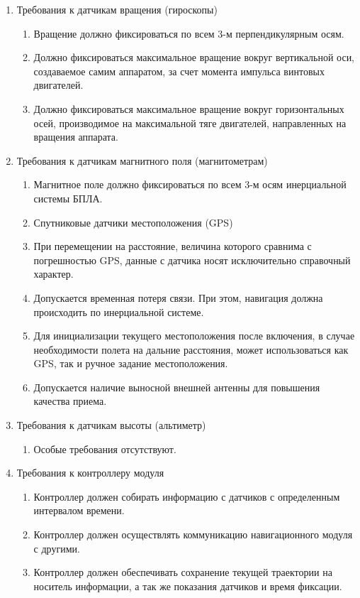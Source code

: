 \documentclass[utf8]{report}
\begin{document}
\begin{enumerate}
\begin{enumerate}
  \end{enumerate}
  \item Требования к датчикам вращения (гироскопы)
  \begin{enumerate}
    \item Вращение должно фиксироваться по всем 3-м перпендикулярным осям.
    \item Должно фиксироваться максимальное вращение вокруг вертикальной оси, создаваемое самим аппаратом, за счет момента импульса винтовых двигателей.
    \item Должно фиксироваться максимальное вращение вокруг горизонтальных осей, производимое на максимальной тяге двигателей, направленных на вращения аппарата.
  \end{enumerate}
  \item Требования к датчикам магнитного поля (магнитометрам)
  \begin{enumerate}
    \item Магнитное поле должно фиксироваться по всем 3-м осям инерциальной системы БПЛА.
    \item Спутниковые датчики местоположения (GPS)
    \item При перемещении на расстояние, величина которого сравнима с погрешностью GPS, данные с датчика носят исключительно справочный характер.
    \item Допускается временная потеря связи. При этом, навигация должна происходить по инерциальной системе.
    \item Для инициализации текущего местоположения после включения, в случае необходимости полета на дальние расстояния, может использоваться как GPS,  так и ручное задание местоположения.
    \item Допускается наличие выносной внешней антенны для повышения качества приема.
  \end{enumerate}
  \item Требования к датчикам высоты (альтиметр)
  \begin{enumerate}
    \item Особые требования отсутствуют.
  \end{enumerate}
  \item Требования к контроллеру модуля
  \begin{enumerate}
    \item Контроллер должен собирать информацию с датчиков с определенным интервалом времени.
    \item Контроллер должен осуществлять коммуникацию навигационного модуля с другими.
    \item Контроллер должен обеспечивать сохранение текущей траектории на носитель информации, а так же показания датчиков и время фиксации.
  \end{enumerate}
\end{enumerate}
\end{document}
